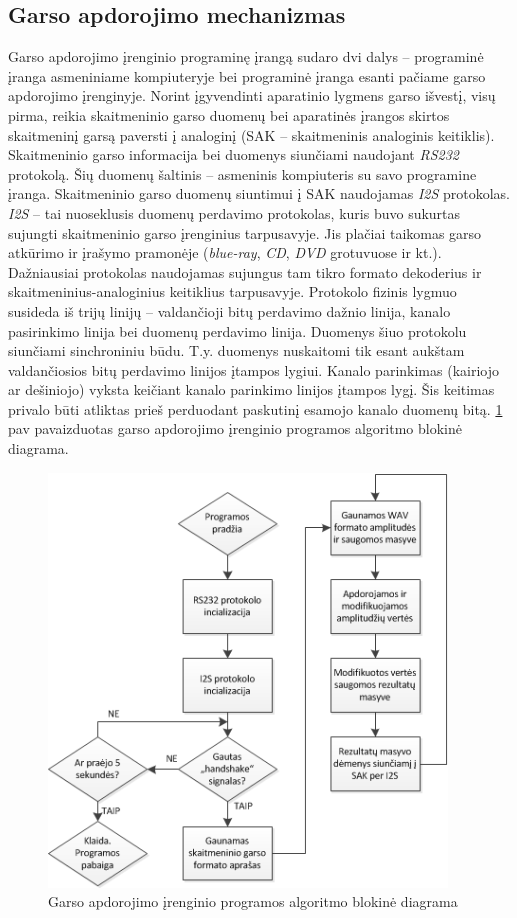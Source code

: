 \documentclass[]{vgtuef}
\begin{document}
\subsection{Garso apdorojimo mechanizmas}

Garso apdorojimo įrenginio programinę įrangą sudaro dvi dalys – programinė įranga asmeniniame kompiuteryje bei programinė įranga esanti pačiame garso apdorojimo įrenginyje. Norint įgyvendinti aparatinio lygmens garso išvestį, visų pirma, reikia skaitmeninio garso duomenų bei aparatinės įrangos skirtos skaitmeninį garsą paversti į analoginį (SAK – skaitmeninis analoginis keitiklis). Skaitmeninio garso informacija bei duomenys siunčiami naudojant \textit{RS232} protokolą. Šių duomenų šaltinis – asmeninis kompiuteris su savo programine įranga. Skaitmeninio garso duomenų siuntimui į SAK naudojamas \textit{I2S} protokolas. \textit{I2S} – tai nuoseklusis duomenų perdavimo protokolas, kuris buvo sukurtas sujungti skaitmeninio garso įrenginius tarpusavyje. Jis plačiai taikomas garso atkūrimo ir įrašymo pramonėje (\textit{blue-ray}, \textit{CD}, \textit{DVD} grotuvuose ir kt.). Dažniausiai protokolas naudojamas sujungus tam tikro formato dekoderius ir skaitmeninius-analoginius keitiklius tarpusavyje. Protokolo fizinis lygmuo susideda iš trijų linijų – valdančioji bitų perdavimo dažnio linija, kanalo pasirinkimo linija bei duomenų perdavimo linija. Duomenys šiuo protokolu siunčiami sinchroniniu būdu. T.y. duomenys nuskaitomi tik esant aukštam valdančiosios bitų perdavimo linijos įtampos lygiui. Kanalo parinkimas (kairiojo ar dešiniojo) vyksta keičiant kanalo parinkimo linijos įtampos lygį. Šis keitimas privalo būti atliktas prieš perduodant paskutinį esamojo kanalo duomenų bitą. \ref{fig:garso_apdorojimas} pav pavaizduotas garso apdorojimo įrenginio programos algoritmo blokinė diagrama.

\begin{figure}[!ht]
  \centering
  \includegraphics[width=400px]{img/garso_apdorojimas.png}
  \caption{Garso apdorojimo įrenginio programos algoritmo blokinė diagrama}
  \label{fig:garso_apdorojimas}
\end{figure}
\end{document}
